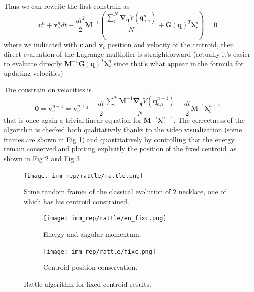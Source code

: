 \documentclass[10pt,a4paper]{article}
\begin{document}
Thus we can rewrite the first constrain as
\[\bm{c}^n+ \bm{v}_c^n dt - \frac{dt^2}{2} \bm{M}^{-1} \left(\frac{\sum_i^N  \bm{\nabla}_{\bm q}V(\bm{q}_{a,i}^n)}{N}  + \bm{G}(\bm{q})^T\bm{\lambda}_r^n \right) = 0 \]
where we indicated with $\bm{c}$ and $\bm{v}_c$ position and velocity of the centroid, then direct evaluation of the Lagrange multiplier is straightforward (actually it's easier to evaluate directly $ \bm{M}^{-1} \bm{G}(\bm{q})^T\bm{\lambda}_r^n$ since that's what appear in the formula for updating velocities)

The constrain on velocities is 
\[ \bm{0} = \bm{v}_c^{n+1} = \bm{v}_c^{n+\frac{1}{2}}-\frac{dt}{2}\frac{\sum_i^N  \bm{M}^{-1}\bm{\nabla}_{\bm q}V(\bm{q}_{a,i}^{n+1})}{N}-\frac{dt}{2} \bm{M}^{-1}\bm{\lambda}_v^{n+1}\]
that is once again a trivial linear equation for $\bm{M}^{-1}\bm{\lambda}_v^{n+1}$.
The correctness of the algorithm is checked both qualitatively thanks to the video visualization (some frames are shown in Fig \ref{fig: rattle}) and quantitatively by controlling that the energy remain conserved and plotting explicitly the position of the fixed centroid, as shown in Fig \ref{subfig: en_rat} and Fig \ref{subfig: cp}

\begin{figure}[h]
	\begin{center}
		\texttt{[image: imm\_rep/rattle/rattle.png]}
	\end{center}
	\caption{Some random frames of the classical evolution of 2 necklace, one of which has his centroid constrained.}
	\label{fig: rattle}
\end{figure}

\begin{figure}[h]
	\begin{center}
		\begin{subfigure}[b]{0.4\textwidth}
		\centering
		\texttt{[image: imm\_rep/rattle/en\_fixc.png]}
		\caption{Energy and angular momentum.}
		\label{subfig: en_rat}
	\end{subfigure}
	\begin{subfigure}[b]{0.4\textwidth}
		\centering
		\texttt{[image: imm\_rep/rattle/fixc.png]}
		\caption{Centroid position conservation.}
		\label{subfig: cp}
	\end{subfigure}
\caption{Rattle algorithm for fixed centroid results.}
\end{center}

	\label{fig: en_rat}
\end{figure}
\end{document}
